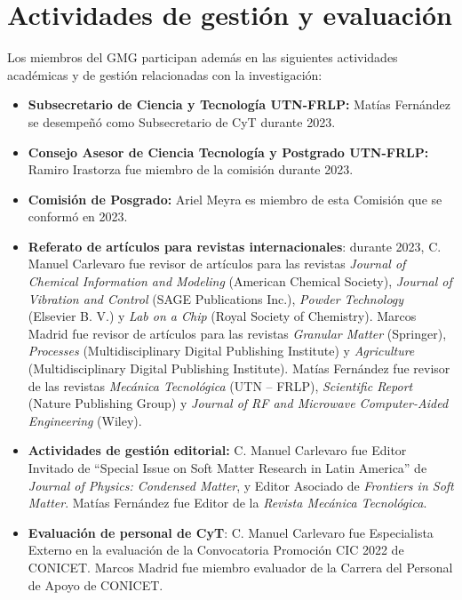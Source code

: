 \documentclass[a4paper,11pt,twoside,final,titlepage,onecolumn,openright]{report}
\begin{document}
\section{Actividades de gestión y evaluación}

Los miembros del GMG participan además en las siguientes actividades académicas y de gestión relacionadas con la investigación:

\begin{itemize}
    \item \textbf{Subsecretario de Ciencia y Tecnología UTN-FRLP:} Matías Fernández se desempeñó como Subsecretario de CyT durante 2023.

  \item \textbf{Consejo Asesor de Ciencia Tecnología y Postgrado UTN-FRLP:} Ramiro Irastorza fue miembro de la comisión durante 2023. 

\item \textbf{Comisión de Posgrado:} Ariel Meyra es miembro de esta Comisión que se conformó en 2023.
  
\item \textbf{Referato de artículos para revistas internacionales}: durante 2023, C. Manuel Carlevaro fue revisor de artículos para las revistas \textit{Journal of Chemical Information and Modeling} (American Chemical Society), \textit{Journal of Vibration and Control} (SAGE Publications Inc.), \textit{Powder Technology} (Elsevier B. V.) y \textit{Lab on a Chip} (Royal Society of Chemistry). Marcos Madrid fue revisor de artículos para las revistas \textit{Granular Matter} (Springer), \textit{Processes} (Multidisciplinary Digital Publishing Institute) y \textit{Agriculture} (Multidisciplinary Digital Publishing Institute). Matías Fernández fue revisor de las revistas \textit{Mecánica Tecnológica} (UTN -- FRLP), \textit{Scientific Report} (Nature Publishing Group) y \textit{Journal of RF and Microwave Computer-Aided Engineering} (Wiley).
 
\item \textbf{Actividades de gestión editorial:} C. Manuel Carlevaro fue Editor Invitado de ``Special Issue on Soft Matter Research in Latin America'' de \textit{Journal of Physics: Condensed Matter}, y Editor Asociado de \textit{Frontiers in Soft Matter}. Matías Fernández fue Editor de la \textit{Revista Mecánica Tecnológica}.
 
     \item \textbf{Evaluación de personal de CyT}: C. Manuel Carlevaro fue Especialista Externo en la evaluación de la Convocatoria Promoción CIC 2022 de CONICET. Marcos Madrid fue miembro evaluador de la Carrera del Personal de Apoyo de CONICET.


\end{itemize}
\end{document}
